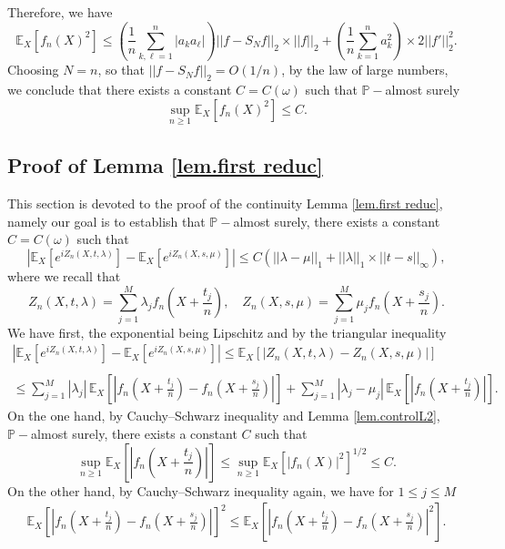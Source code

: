 \documentclass{svproc}
\newcommand \Esp {\mathbb{E}}
\begin{document}
Therefore, we have 
\[
\mathbb E_X [f_n(X)^2] \leq \left(  \frac{1}{n} \sum_{k, \ell=1}^n |a_k a_{\ell} |\right) ||f-S_N  f||_2 \times ||f||_2 + \left( \frac{1}{n} \sum_{k=1}^n a_k^2\right) \times 2 || f'||_2^2.
\]
Choosing $N=n$, so that $||f-S_N  f||_2  =O(1/n)$, by the law of large numbers, we conclude that there exists a constant $C=C(\omega)$ such that $\mathbb P-$almost surely 
\[
\sup_{n \geq 1} \mathbb E_X [f_n(X)^2] \leq C.
\]
\subsection{Proof of Lemma \ref{lem.first reduc}}\label{sec.first reduc}
This section is devoted to the proof of the continuity Lemma \ref{lem.first reduc}, namely our goal is to establish that $\mathbb P-$almost surely, there exists a constant $C=C(\omega)$ such that 
\[
\left| \Esp_X \left[e^{iZ_n(X,t,\lambda)} \right] -\Esp_X \left[e^{iZ_n(X,s,\mu)} \right]  \right|\leq C\left( ||\lambda-\mu||_1 +||\lambda||_1 \times ||t-s||_{\infty}\right),
\]
where we recall that 
\[
Z_n(X,t,\lambda)=\sum_{j=1}^{M}\lambda_j f_n\left(X+\frac{t_j}{n}\right), \quad Z_n(X,s,\mu)=\sum_{j=1}^{M}\mu_j f_n\left(X+\frac{s_j}{n}\right).
\]
We have first, the exponential being Lipschitz and by the triangular inequality
\[
\begin{array}{ll}
\displaystyle{\left| \Esp_X \left[e^{iZ_n(X,t,\lambda)} \right] -\Esp_X \left[e^{iZ_n(X,s,\mu)} \right]  \right| \leq\Esp_X \left[\left| Z_n(X,t,\lambda)-  Z_n(X,s,\mu) \right|\right]}\\
\\
\displaystyle{\leq \sum_{j=1}^M |\lambda_j| \, \mathbb E_X \left[\left| f_n\left(X+\frac{t_j}{n}\right)-f_n\left(X+\frac{s_j}{n}\right)\right|  \right]+\sum_{j=1}^M |\lambda_j-\mu_j| \, \mathbb E_X \left[\left| f_n\left(X+\frac{t_j}{n}\right)\right|\right]}.
\end{array}
\]
On the one hand, by Cauchy--Schwarz inequality and Lemma \ref{lem.controlL2}, $\mathbb P-$almost surely, there exists a constant $C$ such that 
\[
\sup_{ n\geq 1} \mathbb E_X \left[\left| f_n\left(X+\frac{t_j}{n}\right)\right|\right] \leq \sup_{ n\geq 1} \mathbb E_X \left[\left| f_n\left(X\right)\right|^2\right]^{1/2}\leq C.
\]
On the other hand, by Cauchy--Schwarz inequality again, we have for $1 \leq j \leq M$ 
\[
\begin{array}{ll}
\displaystyle{ \mathbb E_X \left[\left| f_n\left(X+\frac{t_j}{n}\right)-f_n\left(X+\frac{s_j}{n}\right)\right|  \right]^2  \leq  \mathbb E_X \left[\left| f_n\left(X+\frac{t_j}{n}\right)-f_n\left(X+\frac{s_j}{n}\right)\right|^2  \right]}.
 \end{array}
\]
\end{document}
